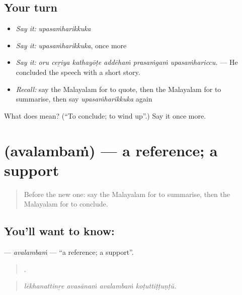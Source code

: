 \subsection*{Your turn}
\begin{itemize}
\raggedright
  \item \emph{Say it:} \emph{upasaṁharikkuka}
  \item \emph{Say it:} \emph{upasaṁharikkuka}, once more
  \item \emph{Say it:} \emph{oru ceṟiya kathayōṭe addēhaṁ prasaṁgaṁ upasaṁhariccu.} — He concluded the speech with a short story.
  \item \emph{Recall:} say the Malayalam for to quote, then the Malayalam for to summarise, then say \emph{upasaṁharikkuka} again
\end{itemize}

\begin{tcolorbox}[breakable,colback=teal!4,colframe=teal!35!black,title={Before you move on}]
What does  mean? (\textquotedblleft{}To conclude; to wind up\textquotedblright{}.) Say it once more.
\end{tcolorbox}
\section[\texorpdfstring{\ml{അവലംബം} (avalambaṁ)}{അവലംബം (avalambaṁ)}]{ (avalambaṁ) — a reference; a support}

\label{lesson:ML-C439-avalambam}



\begin{quote}
Before the new one: say the Malayalam for to summarise, then the Malayalam for to conclude.
\end{quote}

\subsection*{You'll want to know: }
\textbf{} — \emph{avalambaṁ} — \textquotedblleft{}a reference; a support\textquotedblright{}.

\begin{quote}
   .
\end{quote}

\begin{quote}
\emph{lēkhanattinṟe avasānaṁ avalambaṁ koṭuttiṭṭuṇṭŭ.}
\end{quote}

